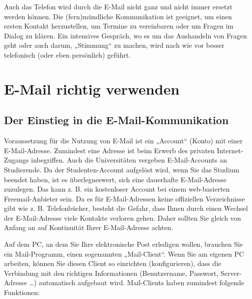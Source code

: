 \documentclass[]{book}
\theoremstyle{definition}
\theoremstyle{definition}
\theoremstyle{definition}
\theoremstyle{remark}
\begin{document}
Auch das Telefon wird durch die E-Mail nicht ganz und nicht immer
ersetzt werden können. Die (fern)mündliche Kommunikation ist geeignet,
um einen ersten Kontakt herzustellen, um Termine zu vereinbaren oder um
Fragen im Dialog zu klären. Ein intensives Gespräch, wo es um das
Aushandeln von Fragen geht oder auch darum, „Stimmung`` zu machen, wird
nach wie vor besser telefonisch (oder eben persönlich) geführt.

\section{E-Mail richtig verwenden}\label{e-mail-richtig-verwenden}

\subsection{Der Einstieg in die
E-Mail-Kommunikation}\label{der-einstieg-in-die-e-mail-kommunikation}

Voraussetzung für die Nutzung von E-Mail ist ein „Account`` (Konto) mit
einer E-Mail-Adresse. Zumindest eine Adresse ist beim Erwerb des
privaten Internet-Zugangs inbegriffen. Auch die Universitäten vergeben
E-Mail-Accounts an Studierende. Da der Studenten-Account aufgelöst wird,
wenn Sie das Studium beendet haben, ist es überlegneswert, sich eine
dauerhafte E-Mail-Adresse zuzulegen. Das kann z. B. ein kostenloser
Account bei einem web-basierten Freemail-Anbieter sein. Da es für
E-Mail-Adressen keine offiziellen Verzeichnisse gibt wie z. B.
Telefonbücher, besteht die Gefahr, dass Ihnen durch einen Wechsel der
E-Mail-Adresse viele Kontakte verloren gehen. Daher sollten Sie gleich
von Anfang an auf Kontinuität Ihrer E-Mail-Adresse achten.

Auf dem PC, an dem Sie Ihre elektronische Post erledigen wollen,
brauchen Sie ein Mail-Programm, einen sogenannten „Mail-Client``. Wenn
Sie am eigenen PC arbeiten, können Sie diesen Client so einrichten
(konfigurieren), dass die Verbindung mit den richtigen Informationen
(Benutzername, Passwort, Server-Adresse \ldots{}) automatisch aufgebaut
wird. Mail-Clients haben zumindest folgende Funktionen:
\end{document}
